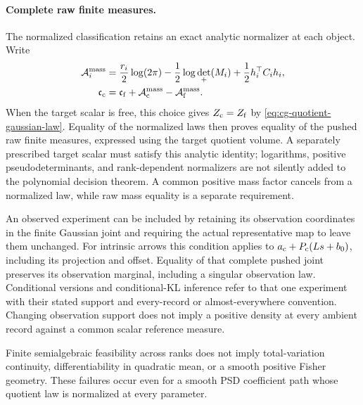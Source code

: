 \paragraph{Complete raw finite measures.}
The normalized classification retains an exact
analytic normalizer at each object. Write
\begin{equation}
\begin{aligned}
\mathcal A_i^{\rm mass}
&=\frac{r_i}{2}\log(2\pi)
-\frac12\log\det_+(M_i)
+\frac12h_i^\top C_i h_i,\\
\mathfrak c_{\rm c}
&=\mathfrak c_{\rm f}
+\mathcal A_{\rm c}^{\rm mass}
-\mathcal A_{\rm f}^{\rm mass}.
\end{aligned}
\label{eq:cg-quotient-raw-scalar}
\end{equation}
When the target scalar is free, this choice gives
\(Z_{\rm c}=Z_{\rm f}\) by
\eqref{eq:cg-quotient-gaussian-law}. Equality of the
normalized laws then proves equality of the pushed
raw finite measures, expressed using the target
quotient volume. A separately prescribed target
scalar must satisfy this analytic identity; logarithms,
positive pseudodeterminants, and rank-dependent
normalizers are not silently added to the polynomial
decision theorem. A common positive mass factor
cancels from a normalized law, while raw mass
equality is a separate requirement.

An observed experiment can be included by retaining
its observation coordinates in the finite Gaussian
joint and requiring the actual representative map
to leave them unchanged. For intrinsic arrows this
condition applies to
\(a_{\rm c}+P_{\rm c}(Ls+b_0)\), including its
projection and offset. Equality of that complete
pushed joint preserves its observation marginal,
including a singular observation law. Conditional
versions and conditional-KL inference refer to that
one experiment with their stated support and
every-record or almost-everywhere convention.
Changing observation support does not imply a
positive density at every ambient record against
a common scalar reference measure.

Finite semialgebraic feasibility across ranks does
not imply total-variation continuity, differentiability
in quadratic mean, or a smooth positive Fisher
geometry. These failures occur even for a smooth
PSD coefficient path whose quotient law is normalized
at every parameter. 

